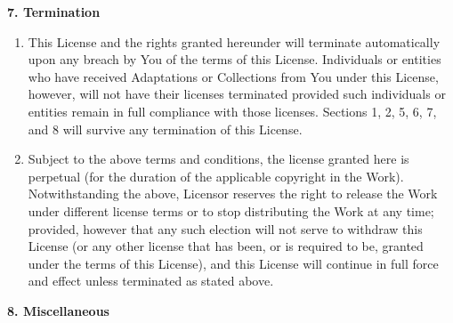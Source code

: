 \textbf{7. Termination}

\begin{enumerate}
\item
  This License and the rights granted hereunder will terminate
  automatically upon any breach by You of the terms of this License.
  Individuals or entities who have received Adaptations or
  Collections from You under this License, however, will not have
  their licenses terminated provided such individuals or entities
  remain in full compliance with those licenses. Sections 1, 2, 5, 6,
  7, and 8 will survive any termination of this License.
\item
  Subject to the above terms and conditions, the license granted here
  is perpetual (for the duration of the applicable copyright in the
  Work). Notwithstanding the above, Licensor reserves the right to
  release the Work under different license terms or to stop
  distributing the Work at any time; provided, however that any such
  election will not serve to withdraw this License (or any other
  license that has been, or is required to be, granted under the
  terms of this License), and this License will continue in full
  force and effect unless terminated as stated above.
\end{enumerate}
\textbf{8. Miscellaneous}

